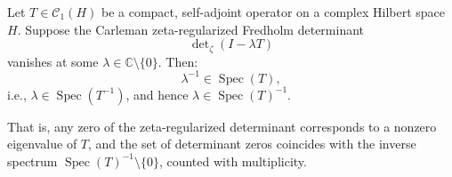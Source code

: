 \begin{lemma}
\label{lem:det-zero-implies-spectrum}
Let \( T \in \mathcal{C}_1(H) \) be a compact, self-adjoint operator on a complex Hilbert space \( H \). Suppose the Carleman zeta-regularized Fredholm determinant
\[
\det\nolimits_{\zeta}(I - \lambda T)
\]
vanishes at some \( \lambda \in \mathbb{C} \setminus \{0\} \). Then:
\[
\lambda^{-1} \in \operatorname{Spec}(T),
\]
i.e., \( \lambda \in \operatorname{Spec}(T^{-1}) \), and hence \( \lambda \in \operatorname{Spec}(T)^{-1} \).

\medskip
\noindent
That is, any zero of the zeta-regularized determinant corresponds to a nonzero eigenvalue of \( T \), and the set of determinant zeros coincides with the inverse spectrum \( \operatorname{Spec}(T)^{-1} \setminus \{0\} \), counted with multiplicity.
\end{lemma}
